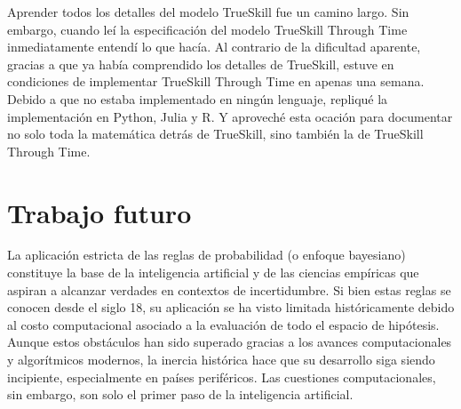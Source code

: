 \documentclass[a4paper,11pt]{book}
\theoremstyle{definition}
\begin{document}

Aprender todos los detalles del modelo TrueSkill fue un camino largo.
%
Sin embargo, cuando le\'i la especificaci\'on del modelo TrueSkill Through Time~\cite{Dangauthier2007} inmediatamente entend\'i lo que hac\'ia.
%
Al contrario de la dificultad aparente, gracias a que ya hab\'ia comprendido los detalles de TrueSkill, estuve en condiciones de implementar TrueSkill Through Time en apenas una semana.
%
Debido a que no estaba implementado en ning\'un lenguaje, repliqu\'e la implementaci\'on en Python, Julia y R.
%
Y aprovech\'e esta ocaci\'on para documentar no solo toda la matem\'atica detr\'as de TrueSkill, sino tambi\'en la de TrueSkill Through Time.


























































\chapter{Trabajo futuro} \label{ch:volverAlFuturo}

La aplicaci\'on estricta de las reglas de probabilidad (o enfoque bayesiano) constituye la base de la inteligencia artificial y de las ciencias emp\'iricas que aspiran a alcanzar verdades en contextos de incertidumbre.
%
Si bien estas reglas se conocen desde el siglo 18, su aplicaci\'on se ha visto limitada hist\'oricamente debido al costo computacional asociado a la evaluaci\'on de todo el espacio de hip\'otesis.
%
Aunque estos obst\'aculos han sido superado gracias a los avances computacionales y algor\'itmicos modernos, la inercia hist\'orica hace que su desarrollo siga siendo incipiente, especialmente en pa\'ises perif\'ericos.
%
Las cuestiones computacionales, sin embargo, son solo el primer paso de la inteligencia artificial.
\end{document}
